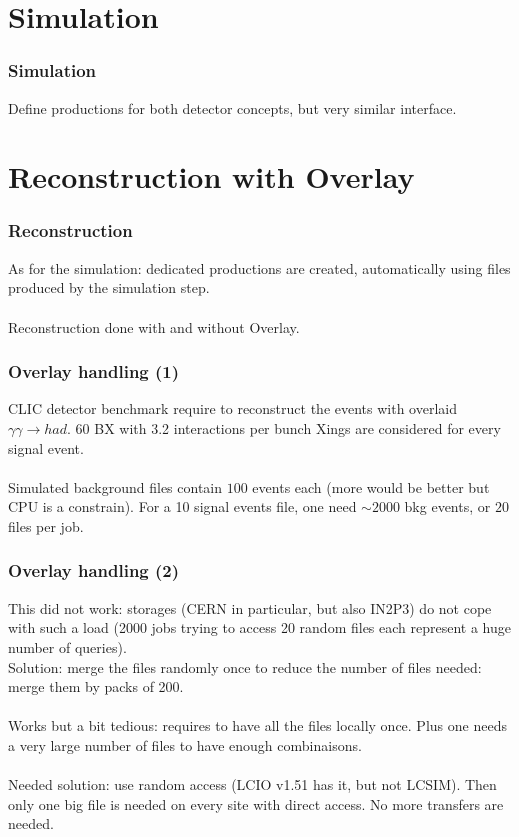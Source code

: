 \documentclass{beamer}
\begin{document}
\section{Simulation}
\begin{frame}
\frametitle{Simulation}
Define productions for both detector concepts, but very similar interface.  
\end{frame}

\section{Reconstruction with Overlay}
\begin{frame}
\frametitle{Reconstruction}
 As for the simulation: dedicated productions are created, automatically using files produced by the simulation step.\\
~\\
Reconstruction done with and without Overlay.
\end{frame}
\begin{frame}
\frametitle{Overlay handling (1)}
CLIC detector benchmark require to reconstruct the events with overlaid $\gamma\gamma \to had$. \alert{60 BX with 3.2 interactions per bunch Xings are considered for every signal event}.\\
~\\
Simulated background files contain $100$ events each (more would be better but CPU is a constrain). For a 10 signal events file, one need $\sim 2000$ bkg events, or \alert{$20$ files per job}.
\end{frame}
\begin{frame}
\frametitle{Overlay handling (2)}
This did not work: storages (CERN in particular, but also IN2P3) do not cope with such a load (2000 jobs trying to access 20 random files each represent a huge number of queries).\\
Solution: \alert{merge the files randomly once} to reduce the number of files needed: merge them by packs of 200.\\ 
~\\
Works but a bit tedious: requires to have all the files locally once. Plus one needs a \alert{very large number of files} to have enough combinaisons.\\
~\\
Needed solution: \alert{use random access} (LCIO v1.51 has it, but not LCSIM). Then only one big file is needed on every site with direct access. No more transfers are needed.
\end{frame}
\end{document}
